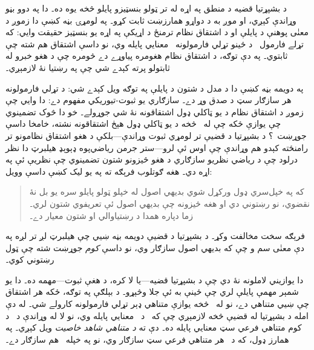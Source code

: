 \documentclass[12pt,a4paper,oneside]{report}
\newcommand{\olfileid}[3]{\gdef\pspart{#1}\gdef\pschapter{#2}\gdef\pssection{#3}}
\gdef\pspart{#2}\gdef\pschapter{#3}\gdef\pssection{}%
\theoremstyle{definition}
\begin{document}
\label{olpseg:OLP-0126-B011:start}
%


\label{olpseg:OLP-0126-B011:end}

\label{olpseg:OLP-0126-B015:start}
%


\label{olpseg:OLP-0126-B015:end}

\label{olpseg:OLP-0127-B004:start}
\olfileid{fol}{com}{int}
\label{olpseg:OLP-0127-B004:end}

\label{olpseg:OLP-0127-B005:start}
\label{olpseg:OLP-0127-B005:end}

\label{olpseg:OLP-0127-B006:start}
د بشپړتيا قضيه د منطق په اړه له تر ټولو بنسټيزو پايلو څخه يوه ده۔
دا په دوو بڼو وړاندې کېږي، او موږ به د دواړو همارزښت ثابت کړو۔ په
لومړۍ بڼه کښې دا زموږ د معنٰی پوهنې د پايلې او د اشتقاق
نظام ترمنځ د اړيکې په اړه يو بنسټيز حقيقت وايي: که
تړلے فارمول~ د ځينو تړلي فارمولونه~\LR{$\Gamma$} معنايي پايله
وي، نو داسې اشتقاق هم شته چې
 ثابتوي۔ په دې توګه، د اشتقاق نظام
هغومره پياوړے دے څومره چې د هغو خبرو له ثابتولو پرته کېدے شي چې
په رښتيا نۀ لازمېږي۔
\label{olpseg:OLP-0127-B006:end}

\label{olpseg:OLP-0127-B007:start}
په دويمه بڼه کښې دا د مدل د شتون د پايلې په توګه ويل کېدے شي: د
تړلي فارمولونه هر سازګار سټ د صدق وړ دے۔ سازګاري يو ثبوت-تيوريکي
مفهوم دے: دا وايي چې زموږ د اشتقاق نظام د يو ټاکلي ډول
اشتقاقونه نۀ شي جوړولے۔ خو دا څوک تضمينوي چې يوازې ځکه چې
له~\LR{$\Gamma$} څخه د يو ټاکلي ډول هېڅ اشتقاقونه نشته، خامخا
داسې جوړښت~؟ د بشپړتيا د
قضيې تر لومړي ثبوت وړاندې---بلکې د هغو اشتقاق نظامونو تر
رامنځته کېدو هم وړاندې چې اوس ئې لرو---ستر جرمن رياضي‌پوه ډېوېډ
هيلبرټ دا نظر درلود چې د رياضي نظريو سازګاري د هغو څيزونو شتون
تضمينوي چې نظريې ئې په اړه دي۔ هغه ګوتلوب فرېګه ته په يو ليک کښې
داسې وويل:
\begin{quote}
  که په خپل‌سري ډول ورکړل شوي بديهي اصول له خپلو ټولو پايلو سره يو
  بل نۀ نقضوي، نو رښتوني دي او هغه څيزونه چې بديهي اصول ئې تعريفوي
  شتون لري۔ زما دپاره همدا د رښتياوالي او شتون معيار دے۔
\end{quote}
فرېګه سخت مخالفت وکړ۔ د بشپړتيا د قضيې دويمه بڼه ښيي چې هيلبرټ
لږ تر لږه په دې معنٰی سم و چې که بديهي اصول سازګار وي، نو داسې
\emph{کوم}
جوړښت شته چې ټول رښتوني کوي۔
\label{olpseg:OLP-0127-B007:end}

\label{olpseg:OLP-0127-B008:start}
دا يوازيني لاملونه نۀ دي چې د بشپړتيا قضيه---يا لا کره، د هغې
ثبوت---مهمه ده۔ دا يو شمېر مهمې پايلې لري چې ځينې به ئې جلا وڅېړو۔
د بېلګې په توګه، ځکه هر اشتقاق چې
 ښيي متناهي دے، نو له~\LR{$\Gamma$} څخه يوازې
متناهي ډېر تړلي فارمولونه کارولے شي۔ له دې امله د بشپړتيا له قضيې
څخه لازمېږي چې که~ د~\LR{$\Gamma$} معنايي پايله وي، نو لا له وړاندې
د~\LR{$\Gamma$} د کوم متناهي فرعي سټ معنايي پايله ده۔ دې ته
\emph{د متناهي شاهد خاصيت} ويل کېږي۔ په همارز ډول، که د~\LR{$\Gamma$}
هر متناهي فرعي سټ سازګار وي، نو په خپله~\LR{$\Gamma$} هم سازګار دے۔
\label{olpseg:OLP-0127-B008:end}
\end{document}
